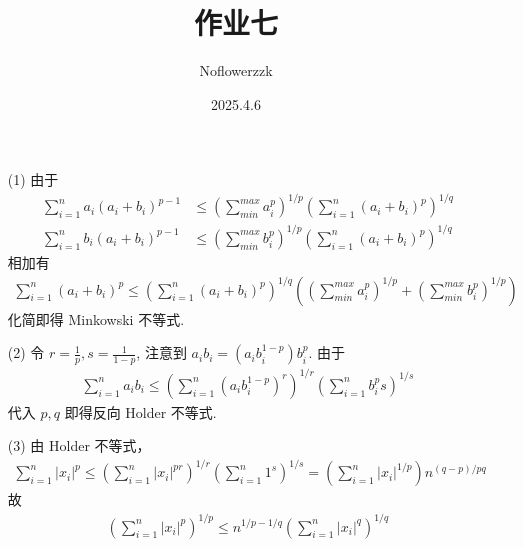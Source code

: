 \documentclass{article}
\title{作业七}
\author{Noflowerzzk}
\date{2025.4.6}
\newcommand{\itn}{\sum_{i = 1}^{n}}
\begin{document}
\maketitle

\section{}

\begin{itemize}
    \item [(1)] 由于
    \begin{align*}
        \sum_{i = 1}^{n}a_i(a_i + b_i)^{p - 1}& \leq \left(\sum_{min}^{max}a_i^p\right)^{1/p}\left(\itn (a_i + b_i)^p\right)^{1/q} \\
        \sum_{i = 1}^{n}b_i(a_i + b_i)^{p - 1}& \leq \left(\sum_{min}^{max}b_i^p\right)^{1/p}\left(\itn (a_i + b_i)^p\right)^{1/q} 
    \end{align*} 相加有
    \begin{align*}
        \itn (a_i + b_i)^p \leq \left(\itn (a_i + b_i)^p\right)^{1/q}\left(\left(\sum_{min}^{max}a_i^p\right)^{1/p} + \left(\sum_{min}^{max}b_i^p\right)^{1/p}\right)
    \end{align*}
    化简即得 Minkowski 不等式.
    \item [(2)] 令 $r = \frac{1}{p}, s = \frac{1}{1 - p}$, 注意到 $a_ib_i = (a_ib_i^{1 - p})b_i^p$. 由于
    \begin{align*}
        \itn a_ib_i \leq \left(\itn (a_ib_i^{1 - p})^r\right)^{1/r}\left(\itn b_i^ps\right)^{1/s}
    \end{align*} 代入 $p, q$ 即得反向 Holder 不等式.
    \item [(3)] 由 Holder 不等式，
    \begin{align*}
        \itn \left\lvert x_i\right\rvert^p \leq \left(\itn \left\lvert x_i\right\rvert^{pr} \right)^{1/r} \left(\itn 1^s\right)^{1/s} = \left(\itn \left\lvert x_i\right\rvert ^{1/p}\right)n^{(q - p)/pq} 
    \end{align*} 故
    \begin{align*}
        \left(\itn \left\lvert x_i\right\rvert^p \right)^{1/p} \leq n^{1/p - 1/q}\left(\itn \left\lvert x_i\right\rvert^q\right)^{1/q}
    \end{align*}
\end{itemize}

\section{}
\end{document}
